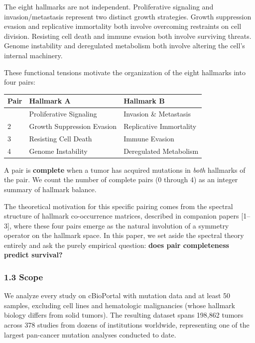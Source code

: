 \documentclass[
  11pt,
]{article}
\newcounter{none} %
\begin{document}
The eight hallmarks are not independent. Proliferative signaling and
invasion/metastasis represent two distinct growth strategies. Growth
suppression evasion and replicative immortality both involve overcoming
restraints on cell division. Resisting cell death and immune evasion
both involve surviving threats. Genome instability and deregulated
metabolism both involve altering the cell's internal machinery.

These functional tensions motivate the organization of the eight
hallmarks into four pairs:

{\def\LTcaptype{none} %
\begin{longtable}[]{@{}lll@{}}
\toprule\noalign{}
Pair & Hallmark A & Hallmark B \\
\midrule\noalign{}
\endhead
\bottomrule\noalign{}
\endlastfoot
1 & Proliferative Signaling & Invasion \& Metastasis \\
2 & Growth Suppression Evasion & Replicative Immortality \\
3 & Resisting Cell Death & Immune Evasion \\
4 & Genome Instability & Deregulated Metabolism \\
\end{longtable}
}

A pair is \textbf{complete} when a tumor has acquired mutations in
\emph{both} hallmarks of the pair. We count the number of complete pairs
(0 through 4) as an integer summary of hallmark balance.

The theoretical motivation for this specific pairing comes from the
spectral structure of hallmark co-occurrence matrices, described in
companion papers {[}1--3{]}, where these four pairs emerge as the
natural involution of a symmetry operator on the hallmark space. In this
paper, we set aside the spectral theory entirely and ask the purely
empirical question: \textbf{does pair completeness predict survival?}

\subsubsection{1.3 Scope}\label{scope}

We analyze every study on cBioPortal with mutation data and at least 50
samples, excluding cell lines and hematologic malignancies (whose
hallmark biology differs from solid tumors). The resulting dataset spans
198,862 tumors across 378 studies from dozens of institutions worldwide,
representing one of the largest pan-cancer mutation analyses conducted
to date.
\end{document}
